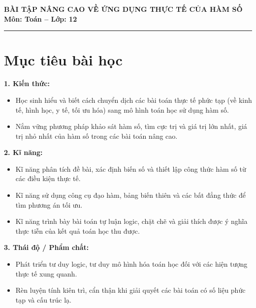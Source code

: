 \documentclass[12pt]{article}
\begin{document}
	
	\begin{center}
		{\LARGE \textbf{BÀI TẬP NÂNG CAO VỀ ỨNG DỤNG THỰC TẾ CỦA HÀM SỐ}}\\[6pt]
		{\large \textbf{Môn: Toán -- Lớp: 12}}
	\end{center}
	\vspace{4mm}
	\hrule
	\vspace{4mm}
	
	\section*{Mục tiêu bài học}
	
	\textbf{1. Kiến thức:}
	\begin{itemize}
		\item Học sinh hiểu và biết cách chuyển dịch các bài toán thực tế phức tạp (về kinh tế, hình học, y tế, tối ưu hóa) sang mô hình toán học sử dụng hàm số.
		\item Nắm vững phương pháp khảo sát hàm số, tìm cực trị và giá trị lớn nhất, giá trị nhỏ nhất của hàm số trong các bài toán nâng cao.
	\end{itemize}
	
	\noindent \textbf{2. Kĩ năng:}
	\begin{itemize}
		\item Kĩ năng phân tích đề bài, xác định biến số và thiết lập công thức hàm số từ các điều kiện thực tế.
		\item Kĩ năng sử dụng công cụ đạo hàm, bảng biến thiên và các bất đẳng thức để tìm phương án tối ưu.
		\item Kĩ năng trình bày bài toán tự luận logic, chặt chẽ và giải thích được ý nghĩa thực tiễn của kết quả toán học thu được.
	\end{itemize}
	
	\noindent \textbf{3. Thái độ / Phẩm chất:}
	\begin{itemize}
		\item Phát triển tư duy logic, tư duy mô hình hóa toán học đối với các hiện tượng thực tế xung quanh.
		\item Rèn luyện tính kiên trì, cẩn thận khi giải quyết các bài toán có số liệu phức tạp và cấu trúc lạ.
	\end{itemize}
	
	\newpage
	
\end{document}
